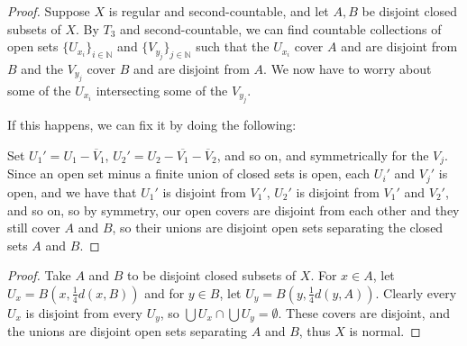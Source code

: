 \begin{proof}
	
	Suppose $X$ is regular and second-countable, and let $A,B$ be disjoint closed subsets of $X$.  By $T_3$ and second-countable, we can find countable collections of open sets $\{U_{x_i}\}_{i\in\mathbb{N}}$ and $\{V_{y_j}\}_{j\in\mathbb{N}}$ such that the $U_{x_i}$ cover $A$ and are disjoint from $B$ and the $V_{y_j}$ cover $B$ and are disjoint from $A$.  We now have to worry about some of the $U_{x_i}$ intersecting some of the $V_{y_j}$.
	
	If this happens, we can fix it by doing the following:
	
	Set $U_1'=U_1-\overline{V}_1$, $U_2'=U_2{-}\overline{V_1}{-}\overline{V}_2$, and so on, and symmetrically for the $V_j$. Since an open set minus a finite union of closed sets is open, each $U_i'$ and $V_j'$ is open, and we have that $U_1'$ is disjoint from $V_1'$, $U_2'$ is disjoint from $V_1'$ and $V_2'$, and so on, so by symmetry, our open covers are disjoint from each other and they still cover $A$ and $B$, so their unions are disjoint open sets separating the closed sets $A$ and $B$.
	
	
\end{proof}



\begin{proof}
	
	Take $A$ and $B$ to be disjoint closed subsets of $X$.  For $x\in A$, let $U_x=B(x,\frac{1}{4}d(x,B))$ and for $y\in B$, let $U_y = B(y,\frac{1}{4}d(y,A))$.  Clearly every $U_x$ is disjoint from every $U_y$, so $\bigcup U_x \cap \bigcup U_y = \emptyset$.  These covers are disjoint, and the unions are disjoint open sets separating $A$ and $B$, thus $X$ is normal.
	

	
\end{proof}


